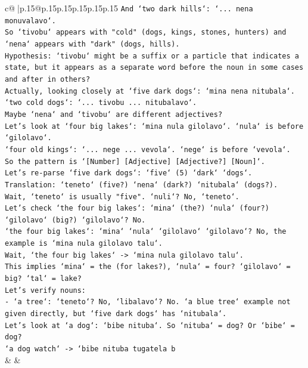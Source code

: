 \documentclass{article}
\begin{document}
{\begin{supertabular}{c@{$\;$}|p{.15\linewidth}@{}p{.15\linewidth}p{.15\linewidth}p{.15\linewidth}p{.15\linewidth}p{.15\linewidth}}
{{{\texttt{And `two dark hills`: `... nena monuvalavo`.} \\
\texttt{So `tivobu` appears with "cold" (dogs, kings, stones, hunters) and `nena` appears with "dark" (dogs, hills).} \\
\texttt{Hypothesis: `tivobu` might be a suffix or a particle that indicates a state, but it appears as a separate word before the noun in some cases and after in others?} \\
\texttt{Actually, looking closely at `five dark dogs`: `mina nena nitubala`.} \\
\texttt{`two cold dogs`: `... tivobu ... nitubalavo`.} \\
\texttt{Maybe `nena` and `tivobu` are different adjectives?} \\
\texttt{Let's look at `four big lakes`: `mina nula gilolavo`. `nula` is before `gilolavo`.} \\
\texttt{`four old kings`: `... nege ... vevola`. `nege` is before `vevola`.} \\
\texttt{So the pattern is `{[}Number{]} {[}Adjective{]} {[}Adjective?{]} {[}Noun{]}`.} \\
\texttt{Let's re{-}parse `five dark dogs`: `five` (5) `dark` `dogs`.} \\
\texttt{Translation: `teneto` (five?) `nena` (dark?) `nitubala` (dogs?).} \\
\texttt{Wait, `teneto` is usually "five". `nuli`? No, `teneto`.} \\
\texttt{Let's check `the four big lakes`: `mina` (the?) `nula` (four?) `gilolavo` (big?) `gilolavo`? No.} \\
\texttt{`the four big lakes`: `mina` `nula` `gilolavo` `gilolavo`? No, the example is `mina nula gilolavo talu`.} \\
\texttt{Wait, `the four big lakes` {-}> `mina nula gilolavo talu`.} \\
\texttt{This implies `mina` = the (for lakes?), `nula` = four? `gilolavo` = big? `tal` = lake?} \\
\texttt{Let's verify nouns:} \\
\texttt{{-} `a tree`: `teneto`? No, `libalavo`? No. `a blue tree` example not given directly, but `five dark dogs` has `nitubala`.} \\
\texttt{Let's look at `a dog`: `bibe nituba`. So `nituba` = dog? Or `bibe` = dog?} \\
\texttt{`a dog watch` {-}> `bibe nituba tugatela b} \\
            }
        }
    }
    & & \\ \\


\end{supertabular}}
\end{document}
